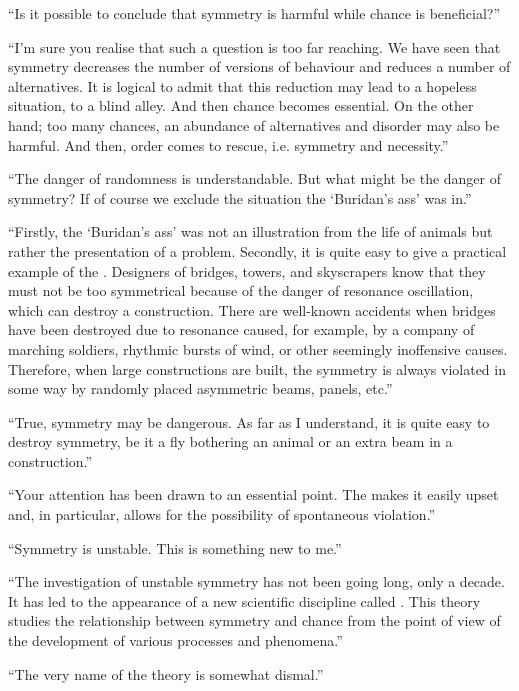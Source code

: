 \begin{dialogue}
\rdr ``Is it possible to conclude that symmetry is harmful while
chance is beneficial?''

\athr ``I'm sure you realise that such a question is too far reaching.
We have seen that symmetry decreases the number of versions of
behaviour and reduces a number of alternatives. It is logical to admit
that this reduction may lead to a hopeless situation, to a blind alley.
And then chance becomes essential. On the other hand; too many
chances, an abundance of alternatives and disorder may also be harmful.
And then, order comes to rescue, i.e. symmetry and necessity.''

\rdr ``The danger of randomness is understandable. But what
might be the danger of symmetry? If of course we exclude the
situation the `Buridan's ass' was in.''

\athr ``Firstly, the `Buridan's ass' was not an illustration from the
life of animals but rather the presentation of a problem. Secondly, it is
quite easy to give a practical example of the . Designers of bridges, towers, and skyscrapers know that they must not be too symmetrical because of the danger of resonance oscillation, which can destroy a construction. There are well-known accidents when bridges have been destroyed due to resonance caused, for
example, by a company of marching soldiers, rhythmic bursts of wind,
or other seemingly inoffensive causes. Therefore, when large
constructions are built, the symmetry is always violated in some way
by randomly placed asymmetric beams, panels, etc.''

\rdr ``True, symmetry may be dangerous. As far as I understand,
it is quite easy to destroy symmetry, be it a fly bothering an animal or
an extra beam in a construction.''

\athr ``Your attention has been drawn to an essential point. The
 makes it easily upset and, in particular, allows for the possibility of spontaneous violation.''

\rdr ``Symmetry is unstable. This is something new to me.''

\athr ``The investigation of unstable symmetry has not been going long, only a decade. It has led to the appearance of a new scientific
discipline called . This theory studies the
relationship between symmetry and chance from the point of view of
the development of various processes and phenomena.''

\rdr ``The very name of the theory is somewhat dismal.''


\end{dialogue}
